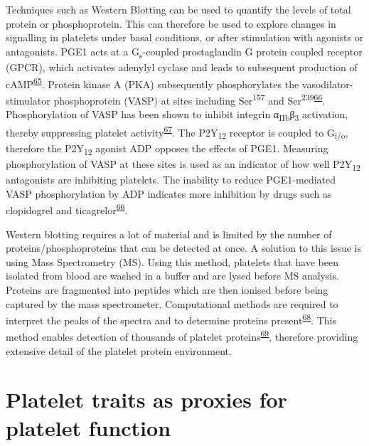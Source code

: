 \documentclass[11pt,twoside]{bristolthesis}
\begin{document}
Techniques such as Western Blotting can be used to quantify the levels of total protein or phosphoprotein. This can therefore be used to explore changes in signalling in platelets under basal conditions, or after stimulation with agonists or antagonists. PGE1 acts at a G\textsubscript{s}-coupled prostaglandin G protein coupled receptor (GPCR), which activates adenylyl cyclase and leads to subsequent production of cAMP\textsuperscript{\protect\hyperlink{ref-Braune2020}{65}}. Protein kinase A (PKA) subsequently phosphorylates the vasodilator-stimulator phosphoprotein (VASP) at sites including Ser\textsuperscript{157} and Ser\textsuperscript{239}\textsuperscript{\protect\hyperlink{ref-Hezard2005}{66}}. Phosphorylation of VASP has been shown to inhibit integrin α\textsubscript{IIb}β\textsubscript{3} activation, thereby suppressing platelet activity\textsuperscript{\protect\hyperlink{ref-Horstrup1994}{67}}. The P2Y\textsubscript{12} receptor is coupled to G\textsubscript{i/o}, therefore the P2Y\textsubscript{12} agonist ADP opposes the effects of PGE1. Measuring phosphorylation of VASP at these sites is used as an indicator of how well P2Y\textsubscript{12} antagonists are inhibiting platelets. The inability to reduce PGE1-mediated VASP phosphorylation by ADP indicates more inhibition by drugs such as clopidogrel and ticagrelor\textsuperscript{\protect\hyperlink{ref-Hezard2005}{66}}.

Western blotting requires a lot of material and is limited by the number of proteins/phosphoproteins that can be detected at once. A solution to this issue is using Mass Spectrometry (MS). Using this method, platelets that have been isolated from blood are washed in a buffer and are lysed before MS analysis. Proteins are fragmented into peptides which are then ionised before being captured by the mass spectrometer. Computational methods are required to interpret the peaks of the spectra and to determine proteins present\textsuperscript{\protect\hyperlink{ref-Wang2013}{68}}. This method enables detection of thousands of platelet proteins\textsuperscript{\protect\hyperlink{ref-Huang2021}{69}}, therefore providing extensive detail of the platelet protein environment.

\hypertarget{platelet-traits-as-proxies-for-platelet-function}{%
\section{Platelet traits as proxies for platelet function}\label{platelet-traits-as-proxies-for-platelet-function}}
\end{document}
